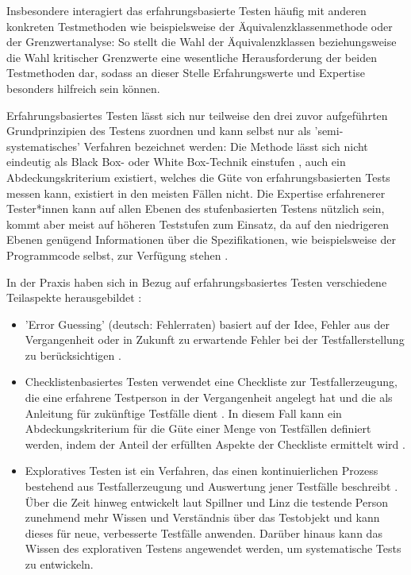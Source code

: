Insbesondere interagiert das erfahrungsbasierte Testen häufig mit anderen konkreten Testmethoden wie beispielsweise der Äquivalenzklassenmethode oder der Grenzwertanalyse: So stellt die Wahl der Äquivalenzklassen beziehungsweise die Wahl kritischer Grenzwerte eine wesentliche Herausforderung der beiden Testmethoden dar, sodass an dieser Stelle Erfahrungswerte und Expertise besonders hilfreich sein können.

Erfahrungsbasiertes Testen lässt sich nur teilweise den drei zuvor aufgeführten Grundprinzipien des Testens zuordnen und kann selbst nur als 'semi-systematisches' Verfahren bezeichnet werden: Die Methode lässt sich nicht eindeutig als Black Box- oder White Box-Technik einstufen \cite[S. 213]{spillner2010basiswissen}, auch ein Abdeckungskriterium existiert, welches die Güte von erfahrungsbasierten Tests messen kann, existiert in den meisten Fällen nicht. Die Expertise erfahrenerer Tester*innen kann auf allen Ebenen des stufenbasierten Testens nützlich sein, kommt aber meist auf höheren Teststufen zum Einsatz, da auf den niedrigeren Ebenen genügend Informationen über die Spezifikationen, wie beispielsweise der Programmcode selbst, zur Verfügung stehen \cite[S. 213]{spillner2010basiswissen}.

In der Praxis haben sich in Bezug auf erfahrungsbasiertes Testen verschiedene Teilaspekte herausgebildet \cite[S.210 ff.]{spillner2010basiswissen}:
\begin{itemize}
\item 'Error Guessing' (deutsch: Fehlerraten) basiert auf der Idee, Fehler aus der Vergangenheit oder in Zukunft zu erwartende Fehler bei der Testfallerstellung zu berücksichtigen \cite[S.210 f.]{spillner2010basiswissen}.
\item Checklistenbasiertes Testen verwendet eine Checkliste zur Testfallerzeugung, die eine erfahrene Testperson in der Vergangenheit angelegt hat und die als Anleitung für zukünftige Testfälle dient \cite[S. 211 f.]{spillner2010basiswissen}. In diesem Fall kann ein Abdeckungskriterium für die Güte einer Menge von Testfällen definiert werden, indem der Anteil der erfüllten Aspekte der Checkliste ermittelt wird \cite[S. 211]{spillner2010basiswissen}.
\item Exploratives Testen ist ein Verfahren, das einen kontinuierlichen Prozess bestehend aus Testfallerzeugung und Auswertung jener Testfälle beschreibt \cite[S. 211]{spillner2010basiswissen}. Über die Zeit hinweg entwickelt laut Spillner und Linz \cite[S. 212]{spillner2010basiswissen} die testende Person zunehmend mehr Wissen und Verständnis über das Testobjekt und kann dieses für neue, verbesserte Testfälle anwenden. Darüber hinaus kann das Wissen des explorativen Testens angewendet werden, um systematische Tests zu entwickeln.
\end{itemize}

